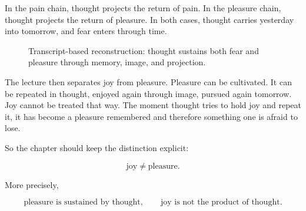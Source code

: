 In the pain chain, thought projects the return of pain. In the pleasure chain, thought projects the return of pleasure. In both cases, thought carries yesterday into tomorrow, and fear enters through time.

\begin{figure}
\centering
{}
\caption{Transcript-based reconstruction: thought sustains both fear and pleasure through memory, image, and projection.}
\end{figure}

The lecture then separates joy from pleasure. Pleasure can be cultivated. It can be repeated in thought, enjoyed again through image, pursued again tomorrow. Joy cannot be treated that way. The moment thought tries to hold joy and repeat it, it has become a pleasure remembered and therefore something one is afraid to lose.

So the chapter should keep the distinction explicit:

\begin{equation}
\text{joy} \neq \text{pleasure}.
\end{equation}

More precisely,

\begin{equation}
\text{pleasure is sustained by thought},
\qquad
\text{joy is not the product of thought}.
\end{equation}

